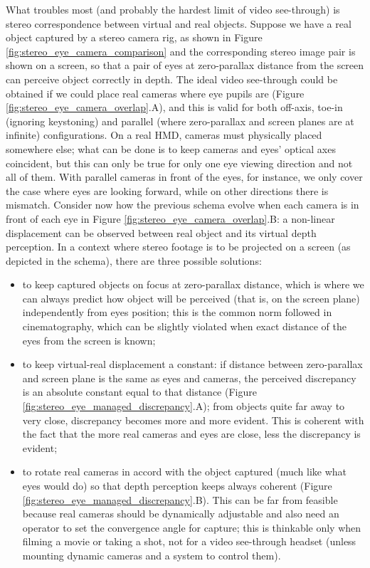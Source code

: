 What troubles most (and probably the hardest limit of video see-through) is stereo correspondence between virtual and real objects. Suppose we have a real object captured by a stereo camera rig, as shown in Figure \ref{fig:stereo_eye_camera_comparison} and the corresponding stereo image pair is shown on a screen, so that a pair of eyes at zero-parallax distance from the screen can perceive object correctly in depth. The ideal video see-through could be obtained if we could place real cameras where eye pupils  are (Figure \ref{fig:stereo_eye_camera_overlap}.A), and this is valid for both off-axis, toe-in (ignoring keystoning) and parallel (where zero-parallax and screen planes are at infinite) configurations. On a real HMD, cameras must physically placed somewhere else; what can be done is to keep cameras and eyes' optical axes coincident, but this can only be true for only one eye viewing direction and not all of them. With parallel cameras in front of the eyes, for instance, we only cover the case where eyes are looking forward, while on other directions there is mismatch. Consider now how the previous schema evolve when each camera is in front of each eye in Figure \ref{fig:stereo_eye_camera_overlap}.B: a non-linear displacement can be observed between real object and its virtual depth perception. In a context where stereo footage is to be projected on a screen (as depicted in the schema), there are three possible solutions:
\begin{itemize}
\item to keep captured objects on focus at zero-parallax distance, which is where we can always predict how object will be perceived (that is, on the screen plane) independently from eyes position; this is the common norm followed in cinematography, which can be slightly violated when exact distance of the eyes from the screen is known;
\item to keep virtual-real displacement a constant: if distance between zero-parallax and screen plane is the same as eyes and cameras, the perceived discrepancy is an absolute constant equal to that distance (Figure \ref{fig:stereo_eye_managed_discrepancy}.A); from objects quite far away to very close, discrepancy becomes more and more evident. This is coherent with the fact that the more real cameras and eyes are close, less the discrepancy is evident;
\item to rotate real cameras in accord with the object captured (much like what eyes would do) so that depth perception keeps always coherent (Figure \ref{fig:stereo_eye_managed_discrepancy}.B). This can be far from feasible because real cameras should be dynamically adjustable and also need an operator to set the convergence angle for capture; this is thinkable only when filming a movie or taking a shot, not for a video see-through headset (unless mounting dynamic cameras and a system to control them).
\end{itemize}

